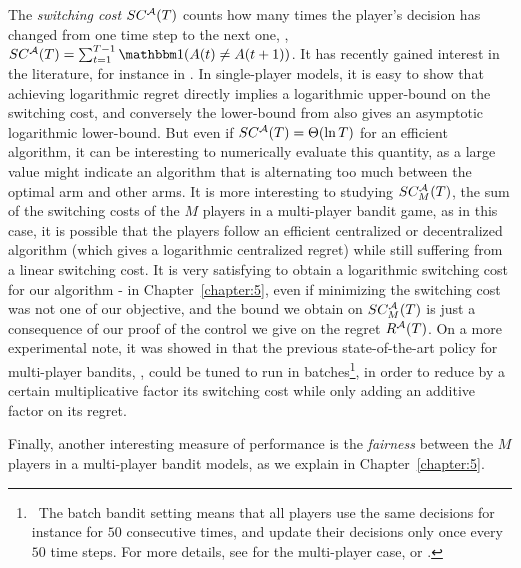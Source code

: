 The \emph{switching cost} $SC^{\mathcal{A}}(T)$ counts how many times the player's decision has changed from one time step to the next one, \ie, $SC^{\cA}(T) = \sum_{t=1}^{T-1} \indic(A(t) \neq A(t+1))$.
It has recently gained interest in the literature, for instance in \cite{Koren17}.
In single-player models,
it is easy to show that achieving logarithmic regret directly implies a logarithmic upper-bound on the switching cost, and conversely the lower-bound from \cite{LaiRobbins85} also gives an asymptotic logarithmic lower-bound.
But even if $SC^{\mathcal{A}}(T) = \Theta(\ln T)$ for an efficient algorithm, it can be interesting to numerically evaluate this quantity, as a large value might indicate an algorithm that is alternating too much between the optimal arm and other arms.
%
It is more interesting to studying $SC_M^{\mathcal{A}}(T)$, the sum of the switching costs of the $M$ players in a multi-player bandit game, as in this case, it is possible that the players follow an efficient centralized or decentralized algorithm (which gives a logarithmic centralized regret) while still suffering from a linear switching cost.
It is very satisfying to obtain a logarithmic switching cost for our algorithm \MCTopM-\klUCB{} in Chapter~\ref{chapter:5}, even if minimizing the switching cost was not one of our objective, and the bound we obtain on $SC_M^{\mathcal{A}}(T)$ is just a consequence of our proof of the control we give on the regret $R^{\mathcal{A}}(T)$.
On a more experimental note, it was showed in \cite{modiDemo2016} that the previous state-of-the-art policy for multi-player bandits, \rhoRand, could be tuned to run in batches\footnote{~The batch bandit setting means that all players use the same decisions for instance for $50$ consecutive times, and update their decisions only once every $50$ time steps. For more details, see \cite{modiDemo2016} for the multi-player case, or \cite{perchet2016,gao2019batched,kolnogorov2019multi}.}, in order to reduce by a certain multiplicative factor its switching cost while only adding an additive factor on its regret.


Finally, another interesting measure of performance is the \emph{fairness} between the $M$ players in a multi-player bandit models, as we explain in Chapter~\ref{chapter:5}.


